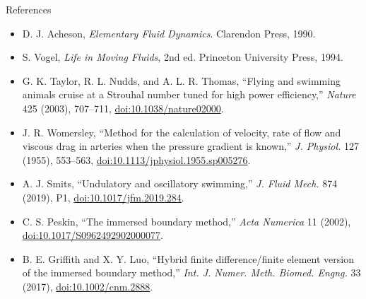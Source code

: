 \documentclass[aspectratio=169,11pt]{beamer}
\begin{document}
\begin{frame}{References}
\small
\begin{itemize}\itemsep4pt
  \item D. J. Acheson, \emph{Elementary Fluid Dynamics}. Clarendon Press, 1990.
  \item S. Vogel, \emph{Life in Moving Fluids}, 2nd ed. Princeton University Press, 1994.
  \item G. K. Taylor, R. L. Nudds, and A. L. R. Thomas, ``Flying and swimming animals cruise at a Strouhal number tuned for high power efficiency,'' \emph{Nature} 425 (2003), 707--711, \href{https://doi.org/10.1038/nature02000}{doi:10.1038/nature02000}.
  \item J. R. Womersley, ``Method for the calculation of velocity, rate of flow and viscous drag in arteries when the pressure gradient is known,'' \emph{J. Physiol.} 127 (1955), 553--563, \href{https://doi.org/10.1113/jphysiol.1955.sp005276}{doi:10.1113/jphysiol.1955.sp005276}.
  \item A. J. Smits, ``Undulatory and oscillatory swimming,'' \emph{J. Fluid Mech.} 874 (2019), P1, \href{https://doi.org/10.1017/jfm.2019.284}{doi:10.1017/jfm.2019.284}.
  \item C. S. Peskin, ``The immersed boundary method,'' \emph{Acta Numerica} 11 (2002), \href{https://doi.org/10.1017/S0962492902000077}{doi:10.1017/S0962492902000077}.
  \item B. E. Griffith and X. Y. Luo, ``Hybrid finite difference/finite element version of the immersed boundary method,'' \emph{Int. J. Numer. Meth. Biomed. Engng.} 33 (2017), \href{https://doi.org/10.1002/cnm.2888}{doi:10.1002/cnm.2888}.
\end{itemize}
\end{frame}
\end{document}
